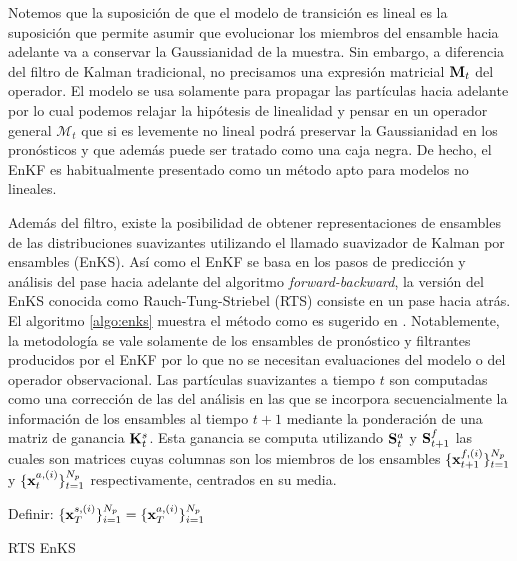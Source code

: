 Notemos que la suposición de que el modelo de transición es lineal es la suposición que permite asumir que evolucionar los miembros del ensamble hacia adelante va a conservar la Gaussianidad de la muestra. Sin embargo, a diferencia del filtro de Kalman tradicional, no precisamos una expresión matricial $\mathbf{M}_t$ del operador. El modelo se usa solamente para propagar las partículas hacia adelante por lo cual podemos relajar la hipótesis de linealidad y pensar en un operador general $\mathcal{M}_t$ que si es levemente no lineal podrá preservar la Gaussianidad en los pronósticos y que además puede ser tratado como una caja negra. De hecho, el EnKF es habitualmente presentado como un método apto para modelos no lineales. 

Además del filtro, existe la posibilidad de obtener representaciones de ensambles de las distribuciones suavizantes utilizando el llamado suavizador de Kalman por ensambles (EnKS). Así como el EnKF se basa en los pasos de predicción y análisis del pase hacia adelante del algoritmo \textit{forward-backward}, la versión del EnKS conocida como Rauch-Tung-Striebel (RTS) consiste en un pase hacia atrás. El algoritmo \ref{algo:enks} muestra el método como es sugerido en \cite{Cosme2012}. Notablemente, la metodología se vale solamente de los ensambles de pronóstico y filtrantes producidos por el EnKF por lo que no se necesitan evaluaciones del modelo o del operador observacional. Las partículas suavizantes a tiempo $t$ son computadas como una corrección de las del análisis en las que se incorpora secuencialmente la información de los ensambles al tiempo $t+1$ mediante la ponderación de una matriz de ganancia $\mathbf{K}_t^s$. Esta ganancia se computa utilizando $\mathbf{S}_t^a$ y $\mathbf{S}_{t+1}^f$ las cuales son matrices cuyas columnas son los miembros de los ensambles $\{\mathbf{x}_{t+1}^{f, (i)}\}_{t=1}^{N_p}$ y  $\{\mathbf{x}_t^{a, (i)}\}_{t=1}^{N_p}$ respectivamente, centrados en su media.

\begin{algorithm}[H]\label{algo:enks}
    Definir: $\{\mathbf{x}_T^{s, (i)} \}_{i=1}^{N_p} = \{\mathbf{x}_T^{a, (i)} \}_{i=1}^{N_p}$
    
\caption{RTS EnKS}
\end{algorithm}

